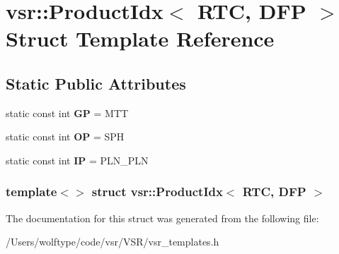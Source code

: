 \hypertarget{structvsr_1_1_product_idx_3_01_r_t_c_00_01_d_f_p_01_4}{\section{vsr\-:\-:Product\-Idx$<$ R\-T\-C, D\-F\-P $>$ Struct Template Reference}
\label{structvsr_1_1_product_idx_3_01_r_t_c_00_01_d_f_p_01_4}
}
\subsection*{Static Public Attributes}
\begin{DoxyCompactItemize}
\item 
\hypertarget{structvsr_1_1_product_idx_3_01_r_t_c_00_01_d_f_p_01_4_aa834d6d5b1c39571c8ef09451c3a2529}{static const int {\bfseries G\-P} = M\-T\-T}\label{structvsr_1_1_product_idx_3_01_r_t_c_00_01_d_f_p_01_4_aa834d6d5b1c39571c8ef09451c3a2529}

\item 
\hypertarget{structvsr_1_1_product_idx_3_01_r_t_c_00_01_d_f_p_01_4_a5df7671bb3aa7c9e39d0d9f6ec6bd44f}{static const int {\bfseries O\-P} = S\-P\-H}\label{structvsr_1_1_product_idx_3_01_r_t_c_00_01_d_f_p_01_4_a5df7671bb3aa7c9e39d0d9f6ec6bd44f}

\item 
\hypertarget{structvsr_1_1_product_idx_3_01_r_t_c_00_01_d_f_p_01_4_a4512d00a706bd6f58f15f46f2c49a1b8}{static const int {\bfseries I\-P} = P\-L\-N\-\_\-\-P\-L\-N}\label{structvsr_1_1_product_idx_3_01_r_t_c_00_01_d_f_p_01_4_a4512d00a706bd6f58f15f46f2c49a1b8}

\end{DoxyCompactItemize}
\subsubsection*{template$<$$>$ struct vsr\-::\-Product\-Idx$<$ R\-T\-C, D\-F\-P $>$}



The documentation for this struct was generated from the following file\-:\begin{DoxyCompactItemize}
\item 
/\-Users/wolftype/code/vsr/\-V\-S\-R/vsr\-\_\-templates.\-h\end{DoxyCompactItemize}

